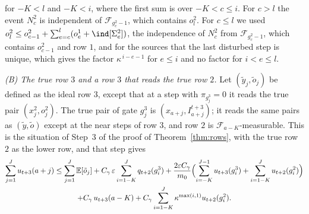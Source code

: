 \documentclass[11pt]{amsart}
\theoremstyle{definition}
\theoremstyle{remark}
\newcommand{\eps}{\varepsilon}
\newcommand{\EE}{\mathbb{E}}
\newcommand{\cF}{\mathcal{F}}
\begin{document}
for $-K<l$ and $-K<i$, where the first sum is over $-K<c\le i$. For $c>l$ the event $N^2_c$ is independent of
$\cF_{g^2_c-1}$, which contains $o^2_l$. For $c\le l$ we used
$o^2_l\le o^2_{c-1}+\sum_{e=c}^{l}(o^1_e+\ind[\Sigma^2_e])$, the independence of $N^2_c$ from
$\cF_{g^2_c-1}$, which contains $o^2_{c-1}$ and row $1$, and for the sources that the last
disturbed step is unique, which gives the factor $\kappa^{\,i-e-1}$ for $e\le i$ and no factor
for $i<e\le l$.

\emph{(B) The true row $3$ and a row $3$ that reads the true row $2$.} Let
$(\tilde y_j,\tilde o_j)$ be defined as the ideal row $3$, except that at a step with
$\pi_{g^3_j}=0$ it reads the true pair $(x^2_j,o^2_j)$. The true pair of gate $g^3_j$ is
$(x_{a+j},I^{t+3}_{a+j})$; it reads the same pairs as $(\tilde y,\tilde o)$ except at the near
steps of row $3$, and row $2$ is $\cF_{a-K}$-measurable. This is the situation of Step~3 of the
proof of Theorem~\ref{thm:rows}, with the true row $2$ as the lower row, and that step gives
\begin{multline}\label{eq:rows3B}
\sum_{j=1}^{J}u_{t+3}(a+j)\le\sum_{j=1}^{J}\EE[\tilde o_j]+C_\gamma\,\eps\sum_{i=1-K}^{J}q_{t+2}(g^3_i)
+\frac{2\eps C_\gamma}{m_0}\Bigl(\sum_{i=-K}^{J-1}u_{t+3}(g^3_i)+\sum_{i=1-K}^{J}u_{t+2}(g^2_i)\Bigr)\\
+C_\gamma\,u_{t+3}(a-K)+C_\gamma\sum_{i=1-K}^{J}\kappa^{\max(i,1)}u_{t+2}(g^2_i).
\end{multline}
\end{document}
